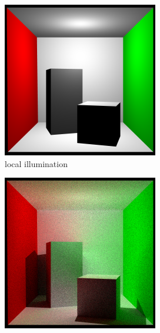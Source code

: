 \documentclass[a4paper, twocolumn]{article}
\begin{document}
    \begin{figure}[ht]
        \centering
        \begin{subfigure}{0.48\linewidth}
            \centering
            \label{fig:cornell_box_local_illumination}
            \includegraphics[width=\linewidth]{share/cornell_local_illumination.png}
            \caption{local illumination}
        \end{subfigure} \hfill
        \begin{subfigure}{0.48\linewidth}
            \centering
            \label{fig:cornell_box_global_illumination}
            \includegraphics[width=\linewidth]{share/cornell_global_illumination.png}

\end{subfigure}
\end{figure}
\end{document}
